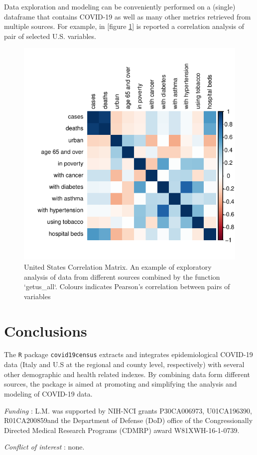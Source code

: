 \documentclass[12pt,halfline,a4paper,]{ouparticle}
\begin{document}
Data exploration and modeling can be conveniently performed on a
(single) dataframe that contains COVID-19 as well as many other metrics
retrieved from multiple sources. For example, in {[}figure
\ref{fig:fig_corr}{]} is reported a correlation analysis of pair of
selected U.S. variables.

\begin{figure}[p]
\includegraphics[width=1\linewidth]{draft_files/figure-latex/fig_corr-1} \caption{United States Correlation Matrix. An example of exploratory analysis of data from different sources combined by the function `getus\_all`. Colours indicates Pearson's correlation between pairs of variables}\label{fig:fig_corr}
\end{figure}

\hypertarget{conclusions}{%
\section{Conclusions}\label{conclusions}}

The \texttt{R} package \texttt{covid19census} extracts and integrates
epidemiological COVID-19 data (Italy and U.S at the regional and county
level, respectively) with several other demographic and health related
indexes. By combining data form different sources, the package is aimed
at promoting and simplifying the analysis and modeling of COVID-19 data.


\begin{notes}[Acknowledgements]
\emph{Funding} : L.M. was supported by NIH-NCI grants P30CA006973,
U01CA196390, R01CA200859and the Department of Defense (DoD) office of
the Congressionally Directed Medical Research Programs (CDMRP) award
W81XWH-16-1-0739.

\emph{Conflict of interest} : none.
\end{notes}


\renewcommand\refname{References}


\end{document}
